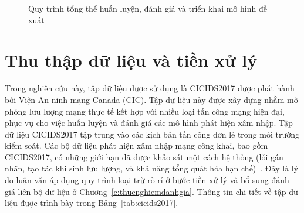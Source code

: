\begin{figure}[htbp]
{}
    \caption{Quy trình tổng thể huấn luyện, đánh giá và triển khai mô hình đề xuất}
    \label{fig:training_model}
\end{figure}

\section{Thu thập dữ liệu và tiền xử lý}
Trong nghiên cứu này, tập dữ liệu được sử dụng là CICIDS2017 được phát hành bởi Viện An ninh mạng Canada (CIC). Tập dữ liệu này được xây dựng nhằm mô phỏng lưu lượng mạng thực tế kết hợp với nhiều loại tấn công mạng hiện đại, phục vụ cho việc huấn luyện và đánh giá các mô hình phát hiện xâm nhập. Tập dữ liệu CICIDS2017 tập trung vào các kịch bản tấn công đơn lẻ trong môi trường kiểm soát. Các bộ dữ liệu phát hiện xâm nhập mạng công khai, bao gồm CICIDS2017, có những giới hạn đã được khảo sát một cách hệ thống (lỗi gán nhãn, tạo tác khi sinh lưu lượng, và khả năng tổng quát hóa hạn chế)~\cite{goldschmidt2025datasets}. Đây là lý do luận văn áp dụng quy trình loại trừ rò rỉ ở bước tiền xử lý và bổ sung đánh giá liên bộ dữ liệu ở Chương~\ref{c:thucnghiemdanhgia}. Thông tin chi tiết về tập dữ liệu được trình bày trong Bảng~\ref{tab:cicids2017}.

